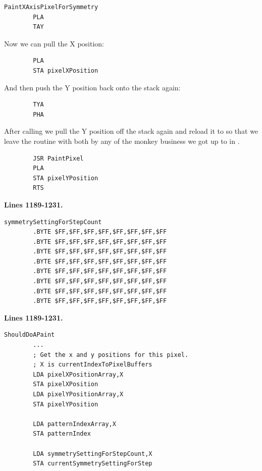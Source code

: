 \begin{lstlisting}
PaintXAxisPixelForSymmetry    
        PLA 
        TAY 
\end{lstlisting}

Now we can pull the X position:
\begin{lstlisting}
        PLA 
        STA pixelXPosition
\end{lstlisting}

And then push the Y position back onto the stack again:
\begin{lstlisting}
        TYA 
        PHA 
\end{lstlisting}

After calling  we pull the Y position off the stack again and reload it to  so that we leave
the routine with both  by any of the monkey business we got up to in .

\begin{lstlisting}
        JSR PaintPixel
        PLA 
        STA pixelYPosition
        RTS 
\end{lstlisting}

\clearpage
\rhead[]{\leftmark}

\clearpage
\textbf{Lines 1189-1231. }
\begin{lstlisting}
symmetrySettingForStepCount
        .BYTE $FF,$FF,$FF,$FF,$FF,$FF,$FF,$FF
        .BYTE $FF,$FF,$FF,$FF,$FF,$FF,$FF,$FF
        .BYTE $FF,$FF,$FF,$FF,$FF,$FF,$FF,$FF
        .BYTE $FF,$FF,$FF,$FF,$FF,$FF,$FF,$FF
        .BYTE $FF,$FF,$FF,$FF,$FF,$FF,$FF,$FF
        .BYTE $FF,$FF,$FF,$FF,$FF,$FF,$FF,$FF
        .BYTE $FF,$FF,$FF,$FF,$FF,$FF,$FF,$FF
        .BYTE $FF,$FF,$FF,$FF,$FF,$FF,$FF,$FF
\end{lstlisting}
\textbf{Lines 1189-1231. }
\begin{lstlisting}
ShouldDoAPaint   
        ...
        ; Get the x and y positions for this pixel.
        ; X is currentIndexToPixelBuffers
        LDA pixelXPositionArray,X
        STA pixelXPosition
        LDA pixelYPositionArray,X
        STA pixelYPosition

        LDA patternIndexArray,X
        STA patternIndex

        LDA symmetrySettingForStepCount,X
        STA currentSymmetrySettingForStep
\end{lstlisting}
\clearpage

